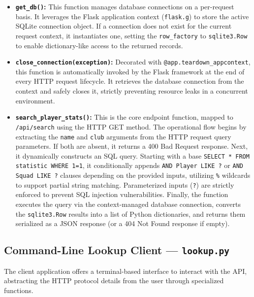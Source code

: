\documentclass[a4paper,12pt]{report}
\begin{document}
\begin{itemize}
    \item \textbf{\texttt{get\_db()}:} This function manages database connections on a per-request basis. It leverages the Flask application context (\texttt{flask.g}) to store the active SQLite connection object. If a connection does not exist for the current request context, it instantiates one, setting the \texttt{row\_factory} to \texttt{sqlite3.Row} to enable dictionary-like access to the returned records.
    
    \item \textbf{\texttt{close\_connection(exception)}:} Decorated with \texttt{@app.teardown\_appcontext}, this function is automatically invoked by the Flask framework at the end of every HTTP request lifecycle. It retrieves the database connection from the context and safely closes it, strictly preventing resource leaks in a concurrent environment.
    
    \item \textbf{\texttt{search\_}\allowbreak\texttt{player\_}\allowbreak\texttt{stats()}:} This is the core endpoint function, mapped to \texttt{/}\allowbreak\texttt{api/}\allowbreak\texttt{search} using the HTTP GET method. The operational flow begins by extracting the \texttt{name} and \texttt{club} arguments from the HTTP request query parameters. If both are absent, it returns a 400 Bad Request response. Next, it dynamically constructs an SQL query. Starting with a base \texttt{SELECT * FROM statistic WHERE 1=1}, it conditionally appends \texttt{AND Player LIKE ?} or \texttt{AND Squad LIKE ?} clauses depending on the provided inputs, utilizing \texttt{\%} wildcards to support partial string matching. Parameterized inputs (\texttt{?}) are strictly enforced to prevent SQL injection vulnerabilities. Finally, the function executes the query via the context-managed database connection, converts the \texttt{sqlite3.}\allowbreak\texttt{Row} results into a list of Python dictionaries, and returns them serialized as a JSON response (or a 404 Not Found response if empty).
\end{itemize}

\subsection{Command-Line Lookup Client --- \texttt{lookup.py}}

The client application offers a terminal-based interface to interact with the API, abstracting the HTTP protocol details from the user through specialized functions.
\end{document}
